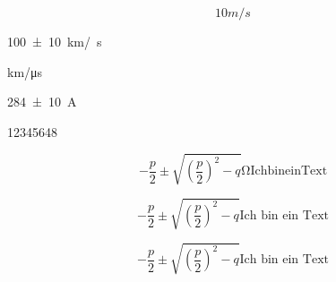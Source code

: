 \documentclass[12pt,ngerman,parskip=full]{scrartcl}
\begin{document}
\[ 10 m/s \] %

\SI{100(10)}{\kilo\meter/\mu\second} %

\si{\kilo\meter/\micro\second} %

\SI{284(10)}{\ampere}

\num{12345648}

\begin{equation}
-\frac{p}{2} \pm \sqrt{ \left(\frac{p}{2}\right)^2 -q } \mathrm{\Omega Ich bin ein Text}
\end{equation}

\begin{equation}
-\frac{p}{2} \pm \sqrt{ \left(\frac{p}{2}\right)^2 -q } \mbox{Ich bin ein Text}
\end{equation}

\begin{equation}
-\frac{p}{2} \pm \sqrt{ \left(\frac{p}{2}\right)^2 -q } \text{Ich bin ein Text}
\end{equation}
\end{document}
